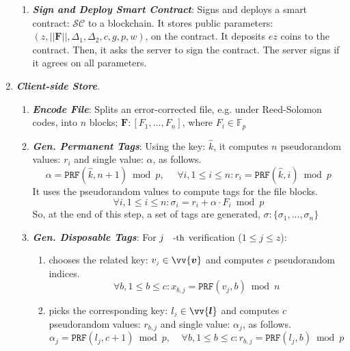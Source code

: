 \begin{enumerate}[leftmargin=.46cm]
\begin{enumerate}
\item\textbf{\textit{\small {Sign and Deploy   Smart Contract}}}: Signs and deploys a smart contract: $\mathcal{SC}$ to a blockchain.  It stores  public parameters: $(z,||{\bm{F}}||, \Delta_{\scriptscriptstyle 1},\Delta_{\scriptscriptstyle 2},c, g,p,w)$, on the contract. It deposits $e z$ coins to the contract. Then, it asks the server to sign the contract. The server signs if it agrees on all parameters.

\end{enumerate}
\item\textit{\textbf{Client-side Store}}.


\begin{enumerate}

\item \textbf{\textit{\small {Encode File}}}: Splits an error-corrected file, e.g. under Reed-Solomon codes, into $n$ blocks; ${\bm{F}}: [F_{\scriptscriptstyle 1},...,F_{\scriptscriptstyle n}]$,  where $ F_{\scriptscriptstyle i}\in \mathbb{F}_p$
\item\label{gen-client-server-tags}\textbf{\textit{\small {Gen. Permanent Tags}}}:  Using the key: $\hat{k}$, it computes $n$ pseudorandom values:  $r_{\scriptscriptstyle i}$ and single value: $\alpha$, as follows.  
 $$\alpha=\mathtt{PRF}(\hat{k},n+1)\bmod p, \  \  \ \  \  \  \forall i, 1\leq i\leq n: r_{\scriptscriptstyle i}=\mathtt{PRF}(\hat{k},i)\bmod p$$
 It uses the pseudorandom values to compute tags for the file blocks. 
 $$\forall i, 1\leq i\leq n: \sigma_{\scriptscriptstyle i}= r_{\scriptscriptstyle i}+ \alpha\cdot F_{\scriptscriptstyle  i}\bmod p$$ 
 So, at the end of this step,  a set of  tags are generated, $\sigma:\{\sigma_{\scriptscriptstyle 1},..., \sigma_{\scriptscriptstyle n}\}$
\item\label{Gen-Disposable-Tags}\textbf{\textit{\small {Gen. Disposable Tags}}}: For   $j\text{\small{-th}}$ verification  ($1\leq j\leq z$):
\begin{enumerate}
\item chooses the related key: $v_{\scriptscriptstyle j}\in\vv{\bm{v}}$ and computes $c$ pseudorandom indices. 
$$\forall b, 1\leq b\leq c: x_{\scriptscriptstyle b,j}=\mathtt{PRF}(v_{\scriptscriptstyle j}, b)\bmod n$$

\item picks the corresponding  key: $l_{\scriptscriptstyle j}\in \vv{\bm{l}}$ and computes $c$ pseudorandom values:  $r_{\scriptscriptstyle b,j}$ and single value: $\alpha_{\scriptscriptstyle j}$, as follows. 
$$\alpha_{\scriptscriptstyle j}=\mathtt{PRF}(l_{\scriptscriptstyle j},c+1)\bmod p, \ \ \ \ \ \forall b, 1\leq b\leq c: r_{\scriptscriptstyle b,j}=\mathtt{PRF}(l_{\scriptscriptstyle j},b)\bmod p$$



\end{enumerate}
\end{enumerate}
\end{enumerate}
